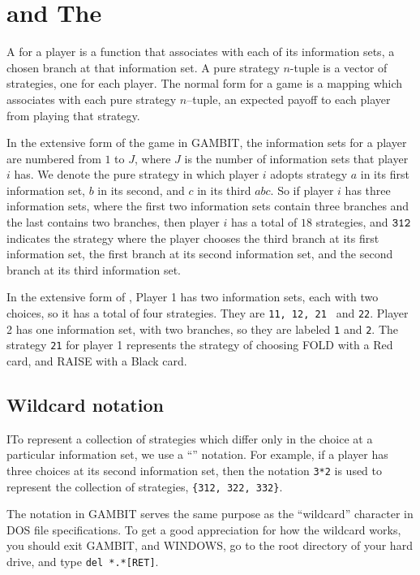 \section{ and The }

A  for a player is a function that 
associates with each of
its information sets, a chosen branch at that information set.  A pure
strategy $n$-tuple is a vector of strategies, one for each player.  
The normal form for a game is a mapping which associates with each pure  
strategy $n$--tuple, an expected payoff to each player from 
playing that strategy. 

In the extensive form of the game in GAMBIT, the information sets for a 
player are numbered from $1$ to $J$, where $J$ is the number of information
 sets that player $i$ has.  We denote the pure strategy in which player $i$
 adopts strategy $a$ in its first information set, $b$ in its second, and 
$c$ in its third $abc$.  So if player $i$ has three information sets, where 
the first two information sets contain three branches and the last contains
 two branches, then player $i$ has a total of $18$ strategies, 
and ${\tt 312}$ indicates the strategy where the player chooses the third 
branch at its first information set, the first branch at its second 
information set, and the second branch at its third information set.  

In the extensive form of , 
Player 1 has two
information sets, each with two choices, so it has a total of four 
strategies.  They are {\tt 11, 12, 21 } and {\tt 22}.  Player 2 has one
 information set, with two branches, so they are labeled {\tt 1} and {\tt 2}.
 The strategy {\tt 21} for player 1 represents the strategy of
choosing FOLD with a Red card, and RAISE with a Black card.  
 
\subsection{Wildcard notation}
ITo represent a collection of strategies which differ only in the choice at
a particular information set, we use a ``'' 
notation.  For example,
if a player has three choices at its second information set, then the 
notation {\tt 3*2} is used to represent the collection of strategies, 
{\tt \{312, 322, 332\}}.  

The {\tt *} notation in GAMBIT serves the same purpose as the ``wildcard'' 
character in DOS file specifications.  To get a good appreciation for how 
the wildcard works, you should exit GAMBIT, and WINDOWS, go to the root 
directory of your hard drive, and type \verb+del *.*[RET]+.

